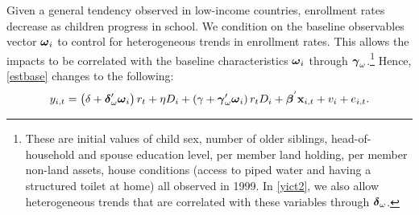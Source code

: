 \documentclass[12pt,letterpaper]{article}
\newcommand{\bfbeta}{\ensuremath{\mbox{\boldmath $\beta$}}}
\newcommand{\bfgamma}{\ensuremath{\mbox{\boldmath $\gamma$}}}
\newcommand{\bfdelta}{\ensuremath{\mbox{\boldmath $\delta$}}}
\newcommand{\bfomega}{\ensuremath{\mbox{\boldmath $\omega$}}}
\newcommand{\0}{\ensuremath{\mbox{\boldmath $0$}}}
\begin{document}
Given a general tendency observed in low-income countries, enrollment rates decrease as children progress in school. We condition on the baseline observables vector $\bfomega_{i}$ to control for heterogeneous trends in enrollment rates. This allows the impacts to be correlated with the baseline characteristics $\bfomega_{i}$ through $\bfgamma_{\omega}$.\footnote{These are initial values of child sex, number of older siblings, head-of-household and spouse education level, per member land holding, per member non-land assets, house conditions (access to piped water and having a structured toilet at home) all observed in 1999. In \eqref{yict2}, we also allow heterogeneous trends that are correlated with these variables through $\bfdelta_{\omega}$. }
Hence, \eqref{estbase} changes to the following:
\begin{equation}
y_{i,t} = 
\left(\delta +\bfdelta'_{\omega}\bfomega_{i}\right)r_{t} + \eta D_{i} +
\left(\gamma + \bfgamma'_{\omega}\bfomega_{i}\right)r_{t}D_{i} + 
\bfbeta^{'}\textbf{x}_{i,t} + v_{i} + e_{i,t}.
\label{yict2}
\end{equation}



\end{document}
